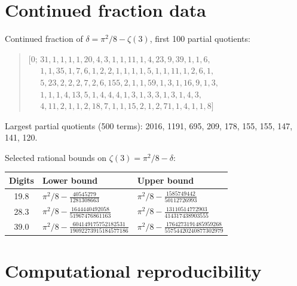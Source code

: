 \documentclass[12pt]{article}
\theoremstyle{definition}
\theoremstyle{remark}
\begin{document}
\section{Continued fraction data}\label{app:cf}

Continued fraction of $\delta=\pi^2/8-\zeta(3)$, first 100 partial
quotients:
\begin{quote}\small
$[0;\, 31, 1, 1, 1, 1, 20, 4, 3, 1, 1, 11, 1, 4, 23, 9, 39, 1, 1, 6,$\\
$\phantom{[0;\,} 1, 1, 35, 1, 7, 6, 1, 2, 2, 1, 1, 1, 1, 5, 1, 1, 11, 1, 2, 6, 1,$\\
$\phantom{[0;\,} 5, 23, 2, 2, 2, 7, 2, 6, 155, 2, 1, 1, 59, 1, 3, 1, 16, 9, 1, 3,$\\
$\phantom{[0;\,} 1, 1, 1, 4, 13, 5, 1, 4, 4, 4, 1, 3, 1, 3, 3, 1, 3, 1, 4, 3,$\\
$\phantom{[0;\,} 4, 11, 2, 1, 1, 2, 18, 7, 1, 1, 15, 2, 1, 2, 71, 1, 4, 1, 1, 8]$
\end{quote}

\noindent Largest partial quotients (500 terms): 2016, 1191, 695, 209,
178, 155, 155, 147, 141, 120.

\medskip\noindent Selected rational bounds on
$\zeta(3)=\pi^2/8-\delta$:

\begin{center}
\small
\begin{tabular}{@{}cp{5cm}p{5cm}@{}}
\toprule
Digits & Lower bound & Upper bound \\
\midrule
19.8 & $\pi^2/8 - \frac{40545279}{1281308663}$
     & $\pi^2/8 - \frac{1585749442}{50112726993}$ \\[6pt]
28.3 & $\pi^2/8 - \frac{1644440492058}{51967476861163}$
     & $\pi^2/8 - \frac{13110514772903}{414317438903555}$ \\[6pt]
39.0 & $\pi^2/8 - \frac{604149175752182531}{19092273915184577186}$
     & $\pi^2/8 - \frac{1764273191485959268}{55754420240877302979}$ \\
\bottomrule
\end{tabular}
\end{center}


\section{Computational reproducibility}\label{app:reproduce}
\end{document}
